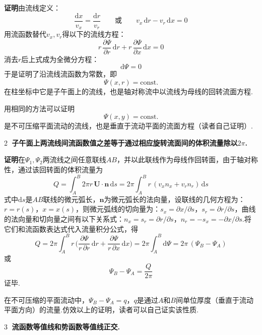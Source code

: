 \textbf{证明}\quad 由流线定义：
\[
\frac{\mathrm{d}x}{v_x}=\frac{\mathrm{d}r}{v_r}\qquad\text{或}\qquad v_x\,\mathrm{d}r-v_r\,\mathrm{d}x=0
\]
用流函数替代$v_x,v_r$得以下的流线方程：
\[
r\,\frac{\partial\Psi}{\partial r}\,\mathrm{d}r+r\,\frac{\partial\Psi}{\partial x}\,\mathrm{d}x=0
\]
消去$r$后上式成为全微分方程：
\[
\mathrm{d}\Psi=0
\]
于是证明了沿流线流函数为常数，即
\[
\Psi(x,r)=\mathrm{const.}
\]
在柱坐标中它是子午面上的流线，也是轴对称流中以流线为母线的回转流面方程.

用相同的方法可以证明
\[
\Psi(x,y)=\mathrm{const.}
\]
是不可压缩平面流动的流线，也是垂直于流动平面的流面方程（读者自己证明）.

\textcircled{2} \textbf{子午面上两流线间流函数值之差等于通过相应旋转流面间的体积流量除以$2\pi$.}

\textbf{证明}\quad 在$\Psi_1,\Psi_2$两流线之间任意联线$AB$，并以此联线作为母线作回转面，由于轴对称性，通过该回转面的体积流量为
\[
Q=\int_A^B 2\pi r\,\boldsymbol{U}\cdot\boldsymbol{n}\,\mathrm{d}s=2\pi\int_A^B r\,(v_x n_x+v_r n_r)\,\mathrm{d}s
\]
式中$\mathrm{d}s$是$AB$联线的微元弧长，$\boldsymbol{n}$为微元弧长的法向量，设联线的几何方程为：$r=r(s)$，$x=x(s)$，则微元弧线的切向量为：$s_x=\partial x/\partial s$，$s_r=\partial r/\partial s$，曲线的法向量和切向量之间有以下关系式：$n_x=s_r=\partial r/\partial s$，$n_r=-s_x=-\partial x/\partial s$.将它们和流函数表达式代入流量积分公式，得
\[
Q=2\pi\int_A^B r\,\Big(\frac{\partial\Psi}{r\,\partial r}\,\mathrm{d}r+\frac{\partial\Psi}{r\,\partial x}\,\mathrm{d}x\Big)=2\pi\int_A^B \mathrm{d}\Psi=2\pi\,(\Psi_B-\Psi_A)
\]
或
\[
\Psi_B-\Psi_A=\frac{Q}{2\pi}
\]
证毕.

在不可压缩的平面流动中，$\Psi_B-\Psi_A=q$，$q$是通过$A$和$B$间单位厚度（垂直于流动平面方向）的流量.仿效以上的证明，读者可以自己证实该性质.

\textcircled{3} \textbf{流函数等值线和势函数等值线正交.}

